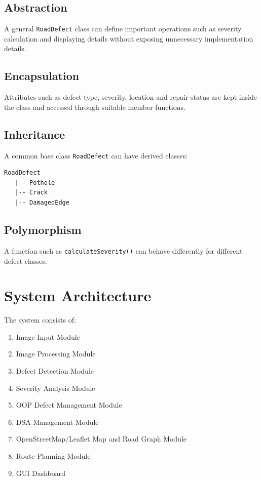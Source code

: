\documentclass[12pt,a4paper]{article}
\begin{document}
\subsection{Abstraction}

A general \texttt{RoadDefect} class can define important operations such as severity calculation and displaying details without exposing unnecessary implementation details.

\subsection{Encapsulation}

Attributes such as defect type, severity, location and repair status are kept inside the class and accessed through suitable member functions.

\subsection{Inheritance}

A common base class \texttt{RoadDefect} can have derived classes:
\begin{verbatim}
RoadDefect
   |-- Pothole
   |-- Crack
   |-- DamagedEdge
\end{verbatim}

\subsection{Polymorphism}

A function such as \texttt{calculateSeverity()} can behave differently for different defect classes.

\section{System Architecture}

The system consists of:
\begin{enumerate}[leftmargin=*]
    \item Image Input Module
    \item Image Processing Module
    \item Defect Detection Module
    \item Severity Analysis Module
    \item OOP Defect Management Module
    \item DSA Management Module
    \item OpenStreetMap/Leaflet Map and Road Graph Module
    \item Route Planning Module
    \item GUI Dashboard
\end{enumerate}
\end{document}
